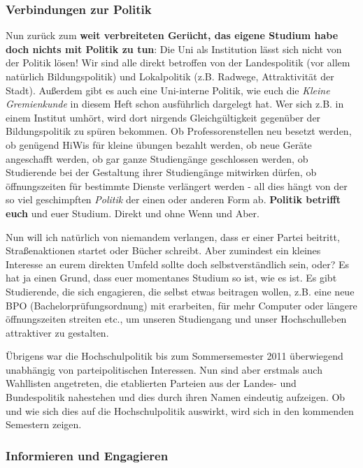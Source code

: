 \begin{multicols}{2}
\subsubsection*{Verbindungen zur Politik}

Nun zurück zum \textbf{weit verbreiteten Gerücht, das eigene Studium habe 
doch nichts mit Politik zu tun}: Die Uni als Institution lässt sich nicht von 
der Politik lösen! Wir sind alle direkt betroffen von der Landespolitik (vor 
allem natürlich Bildungspolitik) und Lokalpolitik (z.B. Radwege, 
Attraktivität der Stadt). Außerdem gibt es auch eine Uni-interne Politik, wie 
euch die \emph{Kleine Gremienkunde} in diesem Heft schon ausführlich dargelegt 
hat. Wer sich z.B. in einem Institut umhört, wird dort nirgends 
Gleichgültigkeit gegenüber der Bildungspolitik zu spüren bekommen. Ob 
Professorenstellen neu besetzt werden, ob genügend HiWis für kleine übungen 
bezahlt werden, ob neue Geräte angeschafft werden, ob gar ganze Studiengänge 
geschlossen werden, ob Studierende bei der Gestaltung ihrer Studiengänge 
mitwirken dürfen, ob öffnungszeiten für bestimmte Dienste verlängert werden 
- all dies hängt von der so viel geschimpften \emph{Politik} der einen oder 
anderen Form ab. \textbf{Politik betrifft euch} und euer Studium. Direkt und 
ohne Wenn und Aber.

Nun will ich natürlich von niemandem verlangen, dass er einer Partei beitritt, 
Straßenaktionen startet oder Bücher schreibt. Aber zumindest ein kleines 
Interesse an eurem direkten Umfeld sollte doch selbstverständlich sein, oder? 
Es hat ja einen Grund, dass euer momentanes Studium so ist, wie es ist. Es gibt 
Studierende, die sich engagieren, die selbst etwas beitragen wollen, z.B. eine 
neue BPO (Bachelorprüfungsordnung) mit erarbeiten, für mehr Computer oder 
längere öffnungszeiten streiten etc., um unseren Studiengang und unser 
Hochschulleben attraktiver zu gestalten.

Übrigens war die Hochschulpolitik bis zum Sommersemester 2011 überwiegend 
unabhängig von parteipolitischen Interessen. Nun sind aber erstmals auch 
Wahllisten angetreten, die etablierten Parteien aus der Landes- und Bundespolitik
nahestehen und dies durch ihren Namen eindeutig aufzeigen. Ob und wie sich dies auf die 
Hochschulpolitik auswirkt, wird sich in den kommenden Semestern zeigen.

\subsubsection*{Informieren und Engagieren}


\end{multicols}
